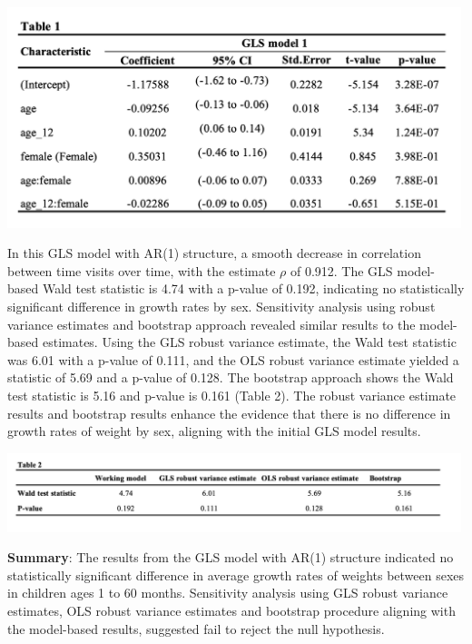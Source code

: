 \documentclass[
]{article}
\begin{document}
\includegraphics[width=5.20833in,height=\textheight]{images/table1.png}

In this GLS model with AR(1) structure, a smooth decrease in correlation
between time visits over time, with the estimate \(\rho\) of 0.912. The
GLS model-based Wald test statistic is 4.74 with a p-value of 0.192,
indicating no statistically significant difference in growth rates by
sex. Sensitivity analysis using robust variance estimates and bootstrap
approach revealed similar results to the model-based estimates. Using
the GLS robust variance estimate, the Wald test statistic was 6.01 with
a p-value of 0.111, and the OLS robust variance estimate yielded a
statistic of 5.69 and a p-value of 0.128. The bootstrap approach shows
the Wald test statistic is 5.16 and p-value is 0.161 (Table 2). The
robust variance estimate results and bootstrap results enhance the
evidence that there is no difference in growth rates of weight by sex,
aligning with the initial GLS model results.

\includegraphics[width=5.20833in,height=\textheight]{images/table2.png}

\textbf{Summary}: The results from the GLS model with AR(1) structure
indicated no statistically significant difference in average growth
rates of weights between sexes in children ages 1 to 60 months.
Sensitivity analysis using GLS robust variance estimates, OLS robust
variance estimates and bootstrap procedure aligning with the model-based
results, suggested fail to reject the null hypothesis.
\end{document}
